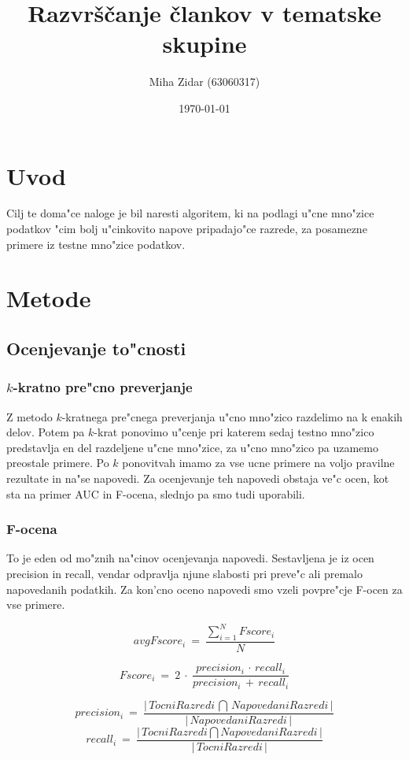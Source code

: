 \documentclass[a4paper,11pt]{article}
\title{Razvrščanje člankov v tematske skupine}
\author{Miha Zidar (63060317)}
\date{\today}
\begin{document}
\maketitle

\section{Uvod}

Cilj te doma"ce naloge je bil naresti algoritem, ki na podlagi u"cne mno"zice podatkov "cim bolj u"cinkovito napove pripadajo"ce razrede, za posamezne primere iz testne mno"zice podatkov.

\section{Metode}

\subsection{Ocenjevanje to"cnosti}

\subsubsection*{$k$-kratno pre"cno preverjanje}
Z metodo $k$-kratnega pre"cnega preverjanja u"cno mno"zico razdelimo na k enakih delov. Potem pa $k$-krat ponovimo u"cenje pri katerem sedaj testno mno"zico predstavlja en del razdeljene u"cne mno"zice, za u"cno mno"zico pa uzamemo preostale primere. Po $k$ ponovitvah imamo za vse ucne primere na voljo pravilne rezultate in na"se napovedi. Za ocenjevanje teh napovedi obstaja ve"c ocen, kot sta na primer AUC in F-ocena, slednjo pa smo tudi uporabili.


\subsubsection*{F-ocena}
To je eden od mo"znih na"cinov ocenjevanja napovedi. Sestavljena je iz ocen precision in recall, vendar odpravlja njune slabosti pri preve"c ali premalo napovedanih podatkih. Za kon'cno oceno napovedi smo vzeli povpre"cje F-ocen za vse primere.

\[avgFscore_i\  =\ \frac{ \sum^{N}_{i=1} Fscore_i }{N} \]

\[Fscore_i\  =\ 2\ \cdot \ \frac{precision_i\, \cdot \, recall_i }{precision_i\, + \, recall_i } \]

\[precision_i \ =\ \frac{|\,TocniRazredi\, \bigcap\, NapovedaniRazredi\, |}{|\,NapovedaniRazredi\, |} \]
\[recall_i \ =\ \frac{|\,TocniRazredi \bigcap NapovedaniRazredi\, |}{|\,TocniRazredi\, |} \]
\end{document}
